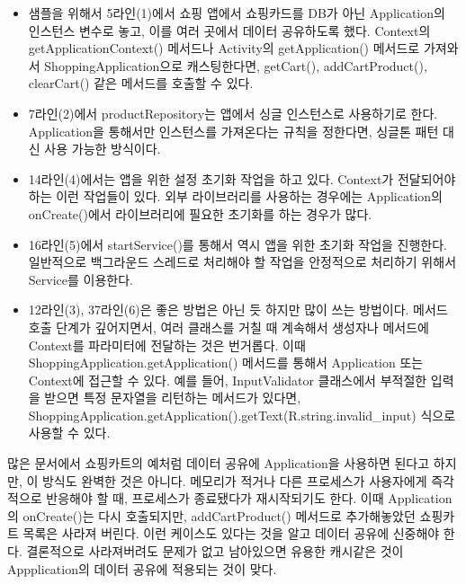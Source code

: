 \begin{itemize}
\item 샘플을 위해서 5라인(1)에서 쇼핑 앱에서 쇼핑카드를 DB가 아닌 Application의 인스턴스 변수로 놓고, 이를 여러 곳에서 데이터 공유하도록 했다.
Context의 getApplicationContext() 메서드나 Activity의 getApplication() 메서드로 가져와서 ShoppingApplication으로 캐스팅한다면, getCart(), addCartProduct(), clearCart() 같은 메서드를 호출할 수 있다.

\item 7라인(2)에서 productRepository는 앱에서 싱글 인스턴스로 사용하기로 한다. Application을 통해서만 인스턴스를 가져온다는 규칙을 정한다면, 싱글톤 패턴 대신 사용 가능한 방식이다.  

\item 14라인(4)에서는 앱을 위한 설정 초기화 작업을 하고 있다. Context가 전달되어야 하는 이런 작업들이 있다. 외부 라이브러리를 사용하는 경우에는 Application의 onCreate()에서 라이브러리에 필요한 초기화를 하는 경우가 많다.

\item 16라인(5)에서 startService()를 통해서 역시 앱을 위한 초기화 작업을 진행한다. 일반적으로 백그라운드 스레드로 처리해야 할 작업을 안정적으로 처리하기 위해서 Service를 이용한다.

\item 12라인(3), 37라인(6)은 좋은 방법은 아닌 듯 하지만 많이 쓰는 방법이다. 
메서드 호출 단계가 깊어지면서, 여러 클래스를 거칠 때 계속해서 생성자나 메서드에 Context를 파라미터에 전달하는 것은 번거롭다. 
이때 ShoppingApplication.getApplication() 메서드를 통해서 Application 또는 Context에 접근할 수 있다.
예를 들어, InputValidator 클래스에서 부적절한 입력을 받으면 특정 문자열을 리턴하는 메서드가 있다면,  ShoppingApplication.getApplication().getText(R.string.invalid\_input) 식으로 사용할 수 있다.
\end{itemize}

많은 문서에서 쇼핑카트의 예처럼 데이터 공유에 Application을 사용하면 된다고 하지만, 이 방식도 완벽한 것은 아니다.
메모리가 적거나 다른 프로세스가 사용자에게 즉각적으로 반응해야 할 때, 프로세스가 종료됐다가 재시작되기도 한다.
이때 Application의 onCreate()는 다시 호출되지만, addCartProduct() 메서드로 추가해놓았던 쇼핑카트 목록은 사라져 버린다. 
이런 케이스도 있다는 것을 알고 데이터 공유에 신중해야 한다.
결론적으로 사라져버려도 문제가 없고 남아있으면 유용한 캐시같은 것이 Appplication의 데이터 공유에 적용되는 것이 맞다.


